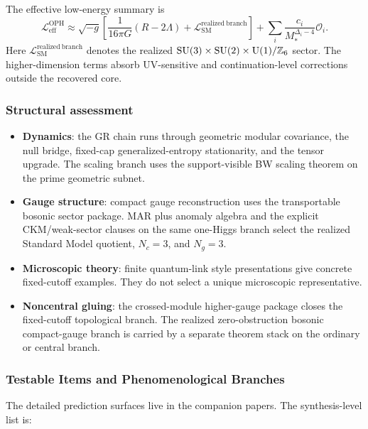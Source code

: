 The effective low-energy summary is
\[
\mathcal L_{\mathrm{eff}}^{\mathrm{OPH}}
\approx
\sqrt{-g}\left[
\frac{1}{16\pi G}(R-2\Lambda)
+
\mathcal L_{\mathrm{SM}}^{\mathrm{realized\ branch}}
\right]
+
\sum_i \frac{c_i}{M_*^{\Delta_i-4}}\mathcal O_i.
\]
Here \(\mathcal L_{\mathrm{SM}}^{\mathrm{realized\ branch}}\) denotes the realized
\(\mathrm{SU}(3)\times\mathrm{SU}(2)\times\mathrm{U}(1)/\mathbb Z_6\) sector. The higher-dimension terms absorb
UV-sensitive and continuation-level corrections outside the recovered core.
\subsubsection{Structural assessment}\label{82-structural-assessment}

\begin{itemize}
\tightlist
\item \textbf{Dynamics}: the GR chain runs through geometric modular covariance, the null bridge,
fixed-cap generalized-entropy stationarity, and the tensor upgrade. The scaling branch uses
the support-visible BW scaling theorem on the prime geometric subnet.
\item \textbf{Gauge structure}: compact gauge reconstruction uses the transportable bosonic
sector package. MAR plus anomaly algebra and the explicit CKM/weak-sector clauses on the same
one-Higgs branch select the realized Standard Model quotient, \(N_c=3\), and \(N_g=3\).
\item \textbf{Microscopic theory}: finite quantum-link style presentations give concrete
fixed-cutoff examples. They do not select a unique microscopic representative.
\item \textbf{Noncentral gluing}: the crossed-module higher-gauge package closes the fixed-cutoff
topological branch. The realized zero-obstruction bosonic compact-gauge branch is carried by a
separate theorem stack on the ordinary or central branch.
\end{itemize}

\subsubsection{Testable Items and Phenomenological Branches}\label{83-novel-testable-predictions}

The detailed prediction surfaces live in the companion papers. The synthesis-level list is:

